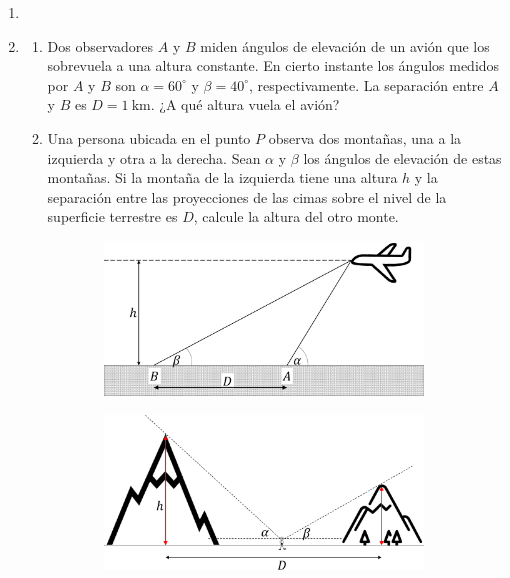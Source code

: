\documentclass[letterpaper,11pt]{article}
\begin{document}
\vspace{-1cm}
\begin{enumerate}\setlength{\itemsep}{0.4cm}


\item[]

\item 
\begin{enumerate}
    \item Dos observadores $A$ y $B$ miden ángulos de elevación de un avión que los sobrevuela a una altura constante. En cierto instante los ángulos medidos por $A$ y $B$ son $\alpha = 60^{\circ}$ y $\beta = 40^{\circ}$, respectivamente. La separación entre $A$ y  $B$ es $D = \SI{1}{\km}$. ¿A qué altura vuela el avión?
    
    \item Una persona ubicada en el punto $P$ observa dos montañas, una a la izquierda y otra a la derecha. Sean $\alpha$ y $\beta$ los ángulos de elevación de estas montañas. Si la montaña de la izquierda tiene una altura $h$ y la separación entre las proyecciones de las cimas sobre el nivel de la superficie terrestre es $D$, calcule la altura del otro monte.
\end{enumerate}

\begin{figure}[h!]
    \centering
    \begin{subfigure}[t]{0.4\textwidth}
        \centering
        \includegraphics[width=0.8\linewidth]{2021-1/Imagenes/aux0/avion.pdf}
        \caption{}
    \end{subfigure}
    \hspace{0.5cm}
    \begin{subfigure}[t]{0.4\textwidth}
        \centering
        \includegraphics[width=0.9\linewidth]{2021-1/Imagenes/aux0/mountain.pdf}
        \caption{}
    \end{subfigure}
\end{figure}


\end{enumerate}
\end{document}
